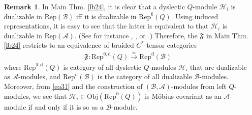 \documentclass[12pt,a4paper,notitlepage]{article}
\theoremstyle{definition}
\newtheorem{rem}[df]{Remark}
\theoremstyle{plain}
\newcommand{\fk}{\mathfrak}
\newcommand{\mc}{\mathcal}
\newcommand{\Rep}{\mathrm{Rep}}
\newcommand{\RepA}{\mathrm{Rep}(\mathcal A)}
\newcommand{\Obj}{\mathrm{Obj}}
\numberwithin{equation}{section}
\begin{document}
\begin{rem}
In Main Thm. \ref{lb24}, it is clear that a dyslectic $Q$-module $\mc H_i$ is dualizable in $\Rep(\mc B)$ iff it is dualizable in $\Rep^0(Q)$. Using induced representations, it is easy to see that the latter is equivalent to that $\mc H_i$ is dualizable in $\RepA$. (See for instance \cite{KO02}, \cite{NY16}, or \cite[Thm. 3.18]{Gui19}.) Therefore, the $\fk F$ in Main Thm. \ref{lb24} restricts to an equivalence of braided $C^*$-tensor categories
\begin{align*}
\fk F:\Rep^{0,\mathrm d}(Q)\xrightarrow{\simeq}\Rep^{\mathrm d}(\mc B)
\end{align*}
where $\Rep^{0,\mathrm d}(Q)$ is category of all dyslectic $Q$-modules $\mc H_i$ that are dualizable as $\mc A$-modules, and  $\Rep^{\mathrm d}(\mc B)$ is the  category of all  dualizable $\mc B$-modules. Moreover, from \eqref{eq31} and the construction of $(\mc B,\mc A)$-modules from left $Q$-modules,  we see that $\mc H_i\in\Obj(\Rep^0(Q))$ is M\"obius covariant as an $\mc A$-module if and only if it is so as a $\mc B$-module. 
\end{rem}










	
	
	
	
	

	
\end{document}
